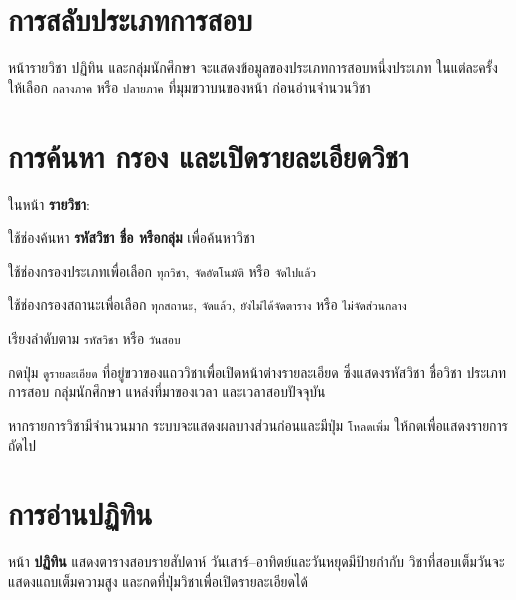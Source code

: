 \section{การสลับประเภทการสอบ}

หน้ารายวิชา ปฏิทิน และกลุ่มนักศึกษา จะแสดงข้อมูลของประเภทการสอบหนึ่งประเภท
ในแต่ละครั้ง ให้เลือก \texttt{กลางภาค} หรือ \texttt{ปลายภาค} ที่มุมขวาบนของหน้า
ก่อนอ่านจำนวนวิชา

\section{การค้นหา กรอง และเปิดรายละเอียดวิชา}

ในหน้า \textbf{รายวิชา}:

\begin{steps}
  \item ใช้ช่องค้นหา \textbf{รหัสวิชา ชื่อ หรือกลุ่ม} เพื่อค้นหาวิชา
  \item ใช้ช่องกรองประเภทเพื่อเลือก \texttt{ทุกวิชา}, \texttt{จัดอัตโนมัติ} หรือ \texttt{จัดไปแล้ว}
  \item ใช้ช่องกรองสถานะเพื่อเลือก \texttt{ทุกสถานะ}, \texttt{จัดแล้ว},
        \texttt{ยังไม่ได้จัดตาราง} หรือ \texttt{ไม่จัดส่วนกลาง}
  \item เรียงลำดับตาม \texttt{รหัสวิชา} หรือ \texttt{วันสอบ}
  \item กดปุ่ม \texttt{ดูรายละเอียด} ที่อยู่ขวาของแถววิชาเพื่อเปิดหน้าต่างรายละเอียด
        ซึ่งแสดงรหัสวิชา ชื่อวิชา ประเภทการสอบ กลุ่มนักศึกษา
        แหล่งที่มาของเวลา และเวลาสอบปัจจุบัน
\end{steps}



\begin{note}
หากรายการวิชามีจำนวนมาก ระบบจะแสดงผลบางส่วนก่อนและมีปุ่ม \texttt{โหลดเพิ่ม}
ให้กดเพื่อแสดงรายการถัดไป
\end{note}

\section{การอ่านปฏิทิน}

หน้า \textbf{ปฏิทิน} แสดงตารางสอบรายสัปดาห์ วันเสาร์–อาทิตย์และวันหยุดมีป้ายกำกับ
วิชาที่สอบเต็มวันจะแสดงแถบเต็มความสูง และกดที่ปุ่มวิชาเพื่อเปิดรายละเอียดได้


